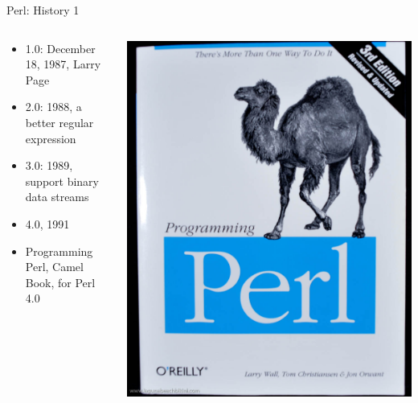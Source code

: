 \documentclass[UTF8]{beamer}
\begin{document}
\begin{frame}[t]{Perl: History 1}
\begin{columns}
  \begin{column}{.7\textwidth}
\begin{itemize}
  \item 1.0: December 18, 1987, Larry Page
  \item 2.0: 1988, a better regular expression
  \item 3.0: 1989, support binary data streams
  \item 4.0, 1991
  \item Programming Perl, Camel Book, for Perl 4.0
\end{itemize}
\end{column}
\begin{column}{.3\textwidth}
\includegraphics[width=\textwidth]{programmingperl.jpg}
\end{column}
\end{columns}
\end{frame}
\end{document}
